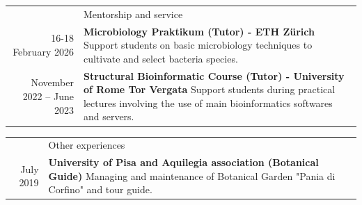\documentclass[letterpaper, 11pt]{article}
\newcommand{\headingfont}{\Large\color{OliveGreen}}
\newenvironment{SectionTable}[1]{
	\renewcommand*{\arraystretch}{1.7}
	\setlength{\tabcolsep}{10pt}
	\begin{longtable}{Rp{5.4in}} & #1 \\}
{\end{longtable}\vspace{-.3cm}}
\begin{document}



\begin{SectionTable}{\headingfont Mentorship and service}
16-18 February 2026 &
\textbf{Microbiology Praktikum (Tutor) - ETH Zürich}\newline
Support students on basic microbiology techniques to cultivate and select bacteria species. \\
November 2022 -- June 2023 &
\textbf{Structural Bioinformatic Course (Tutor) - University of Rome Tor Vergata} \newline
Support students during practical lectures involving the use of main bioinformatics softwares and servers.\\
\end{SectionTable}


\begin{SectionTable}{\headingfont Other experiences}
July 2019 &
\textbf{University of Pisa and Aquilegia association (Botanical Guide)} \newline
Managing and maintenance of Botanical Garden "Pania di Corfino" and tour guide. \\
\end{SectionTable}



\end{document}
